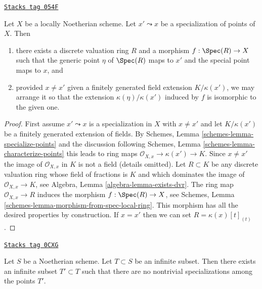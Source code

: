 \begin{lemma}
\label{properties-lemma-locally-Noetherian-specialization-dvr}
\href{https://stacks.math.columbia.edu/tag/054F}{\texttt{Stacks tag 054F}}

Let $X$ be a locally Noetherian scheme.
Let $x' \leadsto x$ be a specialization of points of $X$. Then
\begin{enumerate}
\item there exists a discrete valuation ring $R$ and a morphism
$f : \Spec(R) \to X$ such that the generic point $\eta$ of
$\Spec(R)$ maps to $x'$ and the special point maps to $x$, and
\item provided $x \not = x'$ given a finitely generated field
extension $K/\kappa(x')$, we may arrange it so that the extension
$\kappa(\eta)/\kappa(x')$
induced by $f$ is isomorphic to the given one.
\end{enumerate}
\end{lemma}

\begin{proof}
First assume $x' \leadsto x$ is a specialization in $X$
with $x \not = x'$ and let $K/\kappa(x')$ be a finitely
generated extension of fields. By
Schemes, Lemma \ref{schemes-lemma-specialize-points}
and the discussion following
Schemes, Lemma \ref{schemes-lemma-characterize-points}
this leads to ring maps $\mathcal{O}_{X, x} \to \kappa(x') \to K$.
Since $x \not = x'$ the image of $\mathcal{O}_{X, x}$ in $K$
is not a field (details omitted).
Let $R \subset K$ be any discrete valuation ring whose field of fractions is
$K$ and which dominates the image of $\mathcal{O}_{X, x} \to K$, see
Algebra, Lemma \ref{algebra-lemma-exists-dvr}.
The ring map $\mathcal{O}_{X, x} \to R$ induces the morphism
$f : \Spec(R) \to X$, see
Schemes, Lemma \ref{schemes-lemma-morphism-from-spec-local-ring}.
This morphism has all the desired properties by construction.
If $x = x'$ then we can set $R = \kappa(x)[t]_{(t)}$.
\end{proof}

\begin{lemma}
\label{properties-lemma-thin-infinite-sequence}
\href{https://stacks.math.columbia.edu/tag/0CXG}{\texttt{Stacks tag 0CXG}}

Let $S$ be a Noetherian scheme. Let $T \subset S$ be an infinite subset.
Then there exists an infinite subset $T' \subset T$
such that there are no nontrivial specializations among the points $T'$.
\end{lemma}

